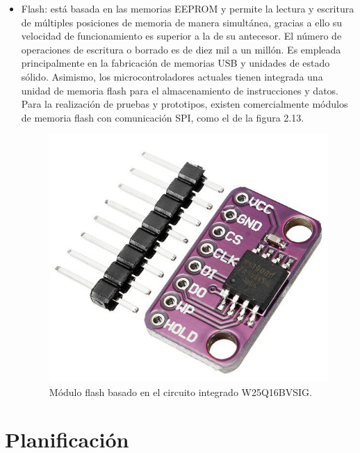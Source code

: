 \begin{itemize}
	\item Flash: está basada en las memorias EEPROM y permite la lectura y escritura de múltiples posiciones de memoria de manera simultánea, gracias a ello su velocidad de funcionamiento es superior a la de su antecesor. El número de operaciones de escritura o borrado es de diez mil a un millón. Es empleada principalmente en la fabricación de memorias USB y unidades de estado sólido. Asimismo, los microcontroladores actuales tienen integrada una unidad de memoria flash para el almacenamiento de instrucciones y datos. Para la realización de pruebas y prototipos, existen comercialmente módulos de memoria flash con comunicación SPI, como el de la figura 2.13.
	\begin{figure}[h]
		\centering
		\includegraphics[scale=0.35]{./Figures/flash.jpg}
		\caption{Módulo flash basado en el circuito integrado W25Q16BVSIG\protect\footnotemark.}
		\label{fig:cuadradoAzul}
	\end{figure}

	
\end{itemize}


\section{Planificación}

